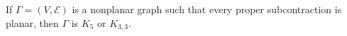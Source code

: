 If $\Gamma = (V, \mathcal{E})$ is a nonplanar graph such that every proper subcontraction is planar, then $\Gamma$ is $K_5$ or $K_{3,3}$.
